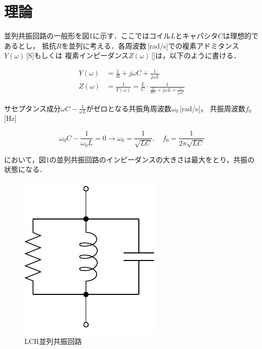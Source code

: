 
\section{理論}

並列共振回路の一般形を図1に示す．ここではコイル$L$とキャパシタ$C$は理想的であるとし，
抵抗$R$を並列に考える．各周波数\omega\,[rad/s]での複素アドミタンス$Y(\omega)$\,[S]もしくは
複素インピーダンス$Z(\omega)$\,[\Omega]は，以下のように書ける．

$$
\begin{aligned}
Y(\omega) &=\frac{1}{R}+j \omega C+\frac{1}{j \omega L} \\
Z(\omega) &=\frac{1}{Y(\omega)}=\frac{L}{C} \cdot \frac{1}{\frac{L}{R C}+j \omega L+\frac{1}{j \omega C}}
\end{aligned}
$$

サセプタンス成分$\omega C-\frac{1}{\omega L}$がゼロとなる共振角周波数$\omega_0$\,[rad/s]，
共振周波数$f_0$\,[Hz]

$$
\omega_0 C-\frac{1}{\omega_0 L}=0 \longrightarrow \omega_0=\frac{1}{\sqrt{L C}}, \quad f_0=\frac{1}{2 \pi \sqrt{L C}}
$$

において，図1の並列共振回路のインピーダンスの大きさは最大をとり，共振の状態になる．

\begin{figure}[H]
    \begin{center}
        \includegraphics[]{figure1.drawio.pdf}
        \caption{LCR並列共振回路}
    \end{center}
\end{figure}

